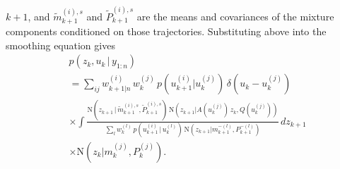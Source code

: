 \documentclass[twocolumn]{autart}    %
\begin{document}
$k+1$, and $\tilde{m}_{k+1}^{(i),s}$ and $\tilde{P}_{k+1}^{(i),s}$ are
the means and covariances of the mixture components conditioned on
those trajectories.
%
%
%
Substituting above into the smoothing equation gives
%
\begin{equation}
\begin{split}
 &p(z_{k},u_{k} \,|\, y_{1:n}) \\
 &= \sum_{ij} w^{(i)}_{k+1|n} \, w_k^{(j)} \,
      p(u_{k+1}^{(i)} | u_k^{(j)}) \, \delta(u_{k} - u_{k}^{(j)}) \\
 &\times \int
    \frac{\mathrm{N}(z_{k+1}\,|\,\tilde{m}_{k+1}^{(i),s},\tilde{P}_{k+1}^{(i),s}) \,
          \mathrm{N}(z_{k+1} | A(u_k^{(j)}) \, z_k, Q(u_k^{(j)}))}
        {\sum_l w_k^{(l)} \, p(u_{k+1}^{(i)}\,|\,u_k^{(l)}) \,
          \mathrm{N}(z_{k+1} | m^{-(l)}_{k+1}, P^{-(l)}_{k+1})} \, dz_{k+1} \\
  &\times \mathrm{N}(z_{k} | m^{(j)}_{k}, P^{(j)}_{k}).
\end{split}
\end{equation}
\end{document}

